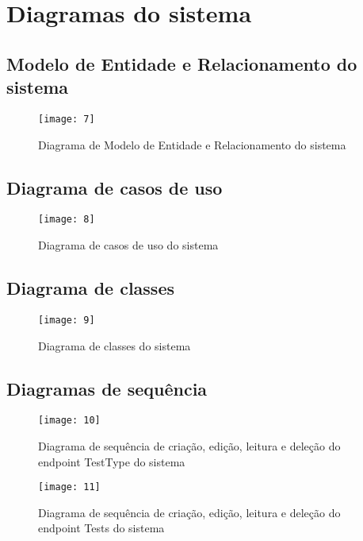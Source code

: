 \section{Diagramas do sistema}

\subsection{Modelo de Entidade e Relacionamento do sistema \cite{26}}

\begin{figure}[h]
  \caption{Diagrama de Modelo de Entidade e Relacionamento do sistema}
  \centering
  \texttt{[image: 7]}
\end{figure}
\FloatBarrier

\subsection{Diagrama de casos de uso \cite{27}}

\begin{figure}[h]
  \caption{Diagrama de casos de uso do sistema}
  \centering
  \texttt{[image: 8]}
\end{figure}
\FloatBarrier

\subsection{Diagrama de classes \cite{27}}

\begin{figure}[h]
  \caption{Diagrama de classes do sistema}
  \centering
  \texttt{[image: 9]}
\end{figure}
\FloatBarrier

\subsection{Diagramas de sequência \cite{28}}

\begin{figure}[h]
  \caption{Diagrama de sequência de criação, edição, leitura e deleção do endpoint TestType do sistema}
  \centering
  \texttt{[image: 10]}
\end{figure}
\FloatBarrier

\begin{figure}[h]
  \caption{Diagrama de sequência de criação, edição, leitura e deleção do endpoint Tests do sistema}
  \centering
  \texttt{[image: 11]}
\end{figure}
\FloatBarrier

